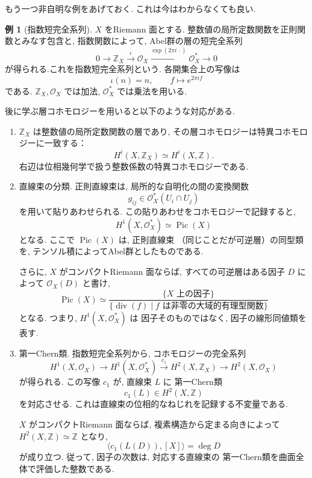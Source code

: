 \documentclass[dvipdfmx,a4paper,11pt]{article} %
\newcommand{\Z}{\mathbb{Z}}
\theoremstyle{definition}
\numberwithin{equation}{section}
\newtheorem{exa}[thm]{例}
\begin{document}
もう一つ非自明な例をあげておく. これは今はわからなくても良い. 
\begin{exa}[指数短完全系列]\label{O-M212}
$X$ をRiemann 面とする.
整数値の局所定数関数を正則関数とみなす包含と, 
指数関数によって, Abel群の層の短完全系列
\[
0\longrightarrow\Z_X
\xrightarrow{\iota}\mathcal O_X
\xrightarrow{\exp(2\pi i\,\cdot)}\mathcal O_X^*
\longrightarrow 0
\]
が得られる.これを指数短完全系列という.
各開集合上の写像は
\[
\iota(n)=n,\qquad
f\longmapsto e^{2\pi i f}
\]
である.
$\Z_X,\mathcal O_X$ では加法, 
$\mathcal O_X^*$ では乗法を用いる. 

後に学ぶ層コホモロジーを用いると以下のような対応がある. 
\begin{enumerate}
\item

$\Z_X$ は整数値の局所定数関数の層であり, 
その層コホモロジーは特異コホモロジーに一致する：
\[
H^i(X,\Z_X)\simeq H^i(X,\Z).
\]
右辺は位相幾何学で扱う整数係数の特異コホモロジーである.

\item

直線束の分類.
正則直線束は, 局所的な自明化の間の変換関数
\[
g_{ij}\in\mathcal O_X^*(U_i\cap U_j)
\]
を用いて貼りあわせられる.
この貼りあわせをコホモロジーで記録すると, 
\[
H^1(X,\mathcal O_X^*)\simeq\operatorname{Pic}(X)
\]
となる.
ここで $\operatorname{Pic}(X)$ は, 正則直線束
（同じことだが可逆層）の同型類を, 
テンソル積によってAbel群としたものである.

さらに, $X$ がコンパクトRiemann 面ならば, 
すべての可逆層はある因子 $D$ によって
$\mathcal O_X(D)$ と書け, 
\[
\operatorname{Pic}(X)
\simeq
\frac{\{\text{$X$ 上の因子}\}}
     {\{\operatorname{div}(f)\mid
       f\text{ は非零の大域的有理型関数}\}}
\]
となる.
つまり, $H^1(X,\mathcal O_X^*)$ は
因子そのものではなく, 因子の線形同値類を表す.

\item

第一Chern類.
指数短完全系列から, コホモロジーの完全系列
\[
H^1(X,\mathcal O_X)
\longrightarrow H^1(X,\mathcal O_X^*)
\xrightarrow{c_1}H^2(X,\Z_X)
\longrightarrow H^2(X,\mathcal O_X)
\]
が得られる.
この写像 $c_1$ が, 直線束 $L$ に
第一Chern類
\[
c_1(L)\in H^2(X,\Z)
\]
を対応させる.
これは直線束の位相的なねじれを記録する不変量である.

$X$ がコンパクトRiemann 面ならば, 
複素構造から定まる向きによって $H^2(X,\Z)\simeq\Z$ となり, 
\[
\bigl\langle c_1(L(D)),[X]\bigr\rangle=\deg D
\]
が成り立つ.
従って, 因子の次数は, 対応する直線束の
第一Chern類を曲面全体で評価した整数である.
\end{enumerate}
\end{exa}
\end{document}
